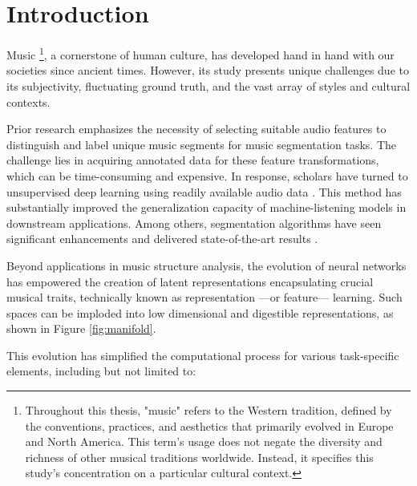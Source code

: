 \chapter{Introduction}

Music \footnote{Throughout this thesis, "music" refers to the Western tradition, defined by the conventions, practices, and aesthetics that primarily evolved in Europe and North America. This term's usage does not negate the diversity and richness of other musical traditions worldwide. Instead, it specifies this study's concentration on a particular cultural context.}, a cornerstone of human culture, has developed hand in hand with our societies since ancient times. However, its study presents unique challenges due to its subjectivity, fluctuating ground truth, and the vast array of styles and cultural contexts.

Prior research emphasizes the necessity of selecting suitable audio features to distinguish and label unique music segments for music segmentation tasks. The challenge lies in acquiring annotated data for these feature transformations, which can be time-consuming and expensive. In response, scholars have turned to unsupervised deep learning using readily available audio data \cite{deepfeaturesegment, Grill2015MusicAnnotations}. This method has substantially improved the generalization capacity of machine-listening models in downstream applications. Among others, segmentation algorithms have seen significant enhancements and delivered state-of-the-art results \cite{Hernandez-Olivan2021MusicFeatures, Li2023MERT:Training}.

Beyond applications in music structure analysis, the evolution of neural networks has empowered the creation of latent representations encapsulating crucial musical traits, technically known as representation ---or feature--- learning. Such spaces can be imploded into low dimensional and digestible representations, as shown in Figure \ref{fig:manifold}.

This evolution has simplified the computational process for various task-specific elements, including but not limited to:

